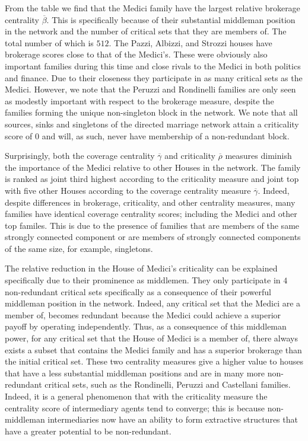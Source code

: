 From the table we find that the Medici family have the largest relative brokerage centrality $\overline{\beta}$. This is specifically because of their substantial middleman position in the network and the number of critical sets that they are members of. The total number of which is $512$. The Pazzi, Albizzi, and Strozzi houses have brokerage scores close to that of the Medici's. These were obviously also important families during this time and close rivals to the Medici in both politics and finance. Due to their closeness they participate in as many critical sets as the Medici. However, we note that the Peruzzi and Rondinelli families are only seen as modestly important with respect to the brokerage measure, despite the families forming the unique non-singleton block in the network. We note that all sources, sinks and singletons of the directed marriage network attain a criticality score of $0$ and will, as such, never have membership of a non-redundant block.

Surprisingly, both the coverage centrality $\overline{\gamma}$ and criticality $\overline{\rho}$ measures diminish the importance of the Medici relative to other Houses in the network. The family is ranked as joint third highest according to the criticality measure and joint top with five other Houses according to the coverage centrality measure $\overline{\gamma}$. Indeed, despite differences in brokerage, criticality, and other centrality measures, many families have identical coverage centrality scores; including the Medici and other top familes. This is due to the presence of families that are members of the same strongly connected component or are members of strongly connected components of the same size, for example, singletons.

The relative reduction in the House of Medici's criticality can be explained specifically due to their prominence as middlemen. They only participate in $4$ non-redundant critical sets specifically as a consequence of their powerful middleman position in the network. Indeed, any critical set that the Medici are a member of, becomes redundant because the Medici could achieve a superior payoff by operating independently. Thus, as a consequence of this middleman power, for any critical set that the House of Medici is a member of, there always exists a subset that contains the Medici family and has a superior brokerage than the initial critical set. These two centrality measures give a higher value to houses that have a less substantial middleman positions and are in many more non-redundant critical sets, such as the Rondinelli, Peruzzi and Castellani families. Indeed, it is a general phenomenon that with the criticality measure the centrality score of intermediary agents tend to converge; this is because non-middleman intermediaries now have an ability to form extractive structures that have a greater potential to be non-redundant.

